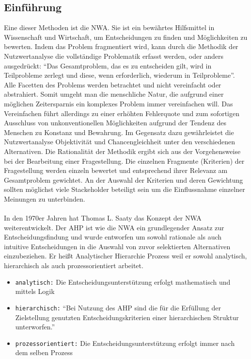 \subsection{Einführung}
Eine dieser Methoden ist die \ac{NWA}. Sie ist ein bewährtes Hilfsmittel in Wissenschaft und Wirtschaft, um Entscheidungen zu finden und Möglichkeiten zu bewerten. Indem das Problem fragmentiert wird, kann durch die Methodik der Nutzwertanalyse die vollständige Problematik erfasst werden, oder anders ausgedrückt: \enquote{Das Gesamtproblem, das es zu entscheiden gilt, wird in Teilprobleme zerlegt und diese, wenn erforderlich, wiederum in Teilprobleme}\autocite[S.1]{Kuehnapfel.2014}. Alle Facetten des Problems werden betrachtet und nicht vereinfacht oder abstrahiert. Somit umgeht man die menschliche Natur, die aufgrund einer möglichen Zeitersparnis ein komplexes Problem immer vereinfachen will. Das Vereinfachen führt allerdings zu einer erhöhten Fehlerquote und zum sofortigen Ausschluss von unkonventionellen Möglichkeiten aufgrund der Tendenz des Menschen zu Konstanz und Bewahrung\autocite[Vgl.][S.1]{Kuehnapfel.2014}. Im Gegensatz dazu gewährleistet die Nutzwertanalyse Objektivität und Chancengleichheit unter den verschiedenen Alternativen.\newline
Die Rationalität der Methodik ergibt sich aus der Vorgehensweise bei der Bearbeitung einer Fragestellung. Die einzelnen Fragmente (Kriterien) der Fragestellung werden einzeln bewertet und entsprechend ihrer Relevanz am Gesamtproblem gewichtet.\autocite[Vgl.][S.10]{Kuehnapfel.2014} An der Auswahl der Kriterien und deren Gewichtung sollten möglichst viele Stackeholder beteiligt sein um die Einflussnahme einzelner Meinungen zu unterbinden.\\
\\
In den 1970er Jahren hat Thomas L. Saaty das Konzept der \ac{NWA} weiterentwickelt. Der \ac{AHP} ist wie die \ac{NWA} ein grundlegender Ansatz zur Entscheidungsfindung und wurde entworfen um sowohl rationale als auch intuitive Entscheidungen in die Auswahl von zuvor selektierten Alternativen einzubeziehen.\autocite[Vgl.][S.1]{Saaty.2012} Er heißt Analytischer Hierarchie Prozess weil er sowohl analytisch, hierarchisch als auch prozessorientiert arbeitet.\autocite{TUM.2015}
\begin{itemize}
	\item\texttt{analytisch:} Die Entscheidungsunterstützung erfolgt mathematisch und mittels Logik
	\item\texttt{hierarchisch:} \enquote{Bei Nutzung des AHP sind die für die Erfüllung der Zielstellung genutzten Entscheidungskriterien einer hierarchischen Struktur unterworfen.}\autocite[S.314]{Hausladen.2016} 
	\item\texttt{prozessorientiert:} Die Entscheidungsunterstützung erfolgt immer nach dem selben Prozess
\end{itemize}

